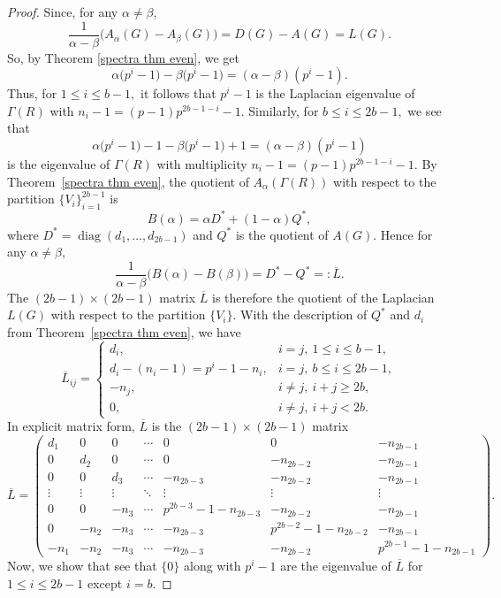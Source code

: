 \documentclass[10pt,a4paper]{amsart}
\begin{document}
\begin{proof}
	Since, for any $\alpha\neq\beta$,
	\[
	\frac{1}{\alpha-\beta}\bigl(A_\alpha(G)-A_\beta(G)\bigr)
	= D(G)-A(G)=L(G).
	\]
	So, by Theorem \ref{spectra thm even}, we get $$\alpha\bigl(p^{ i}-1\bigr)-\beta\bigl(p^{i}-1\bigr)=(\alpha-\beta)(p^{i}-1).$$
	Thus, for $1\le i \le b-1,$ it follows that $p^{i}-1$  is the Laplacian eigenvalue of $ \varGamma(R)$ with $n_i - 1 = (p-1)p^{ 2b-1-i} - 1$. Similarly, for $b\le i \le 2b-1,$ we see that 
	$$\alpha\bigl(p^{ i}-1\bigr) - 1-\beta\bigl(p^{ i}-1\bigr) + 1=(\alpha-\beta)(p^{i}-1) $$ is the eigenvalue of $ \varGamma(R)$ with multiplicity $n_i - 1 = (p-1)p^{ 2b-1-i} - 1$.  By Theorem~\ref{spectra thm even}, the quotient of $A_\alpha( \varGamma(R))$ 
	with respect to the partition $\{V_i\}_{i=1}^{2b-1}$ is
	\[
	B(\alpha) = \alpha D^\ast + (1-\alpha)Q^\ast,
	\]
	where $D^\ast=\operatorname{diag}(d_1,\dots,d_{2b-1})$ and $Q^\ast$ is the quotient of $A(G)$. Hence for any $\alpha\neq\beta$,
	\[
	\frac{1}{\alpha-\beta}\bigl(B(\alpha)-B(\beta)\bigr)
	= D^\ast - Q^\ast =: \overline{L}.
	\]
	The $(2b-1)\times(2b-1)$ matrix $\overline{L}$ is therefore the quotient of the Laplacian $L(G)$ with respect to
	the partition $\{V_i\}$. With the description of $Q^\ast$ and $d_i$ from Theorem~\ref{spectra thm even}, we have
	\[
	\overline{L}_{ij} =
	\begin{cases}
		d_i, & i=j,\ 1\le i\le b-1,\\
		d_i-(n_i-1)=p^{ i}-1-n_i, & i=j,\ b\le i\le 2b-1,\\
		- n_j, & i\ne j,\ i+j\ge 2b,\\
		0, & i\ne j,\ i+j<2b.
	\end{cases}
	\]
In explicit matrix form, $\overline{L}$ is the $(2b-1)\times(2b-1)$ matrix
\[
\overline{L}=
\begin{pmatrix}
	d_1 & 0   & 0   & \cdots & 0         & 0         & -n_{2b-1} \\[3pt]
	0   & d_2 & 0   & \cdots & 0         & -n_{2b-2} & -n_{2b-1} \\[3pt]
	0   & 0   & d_3 & \cdots & -n_{2b-3} & -n_{2b-2} & -n_{2b-1} \\[3pt]
	\vdots & \vdots & \vdots & \ddots & \vdots    & \vdots    & \vdots \\[3pt]
	0   & 0   & -n_3 & \cdots &
	p^{ 2b-3}-1-n_{2b-3} & -n_{2b-2} & -n_{2b-1} \\[3pt]
	0   & -n_2 & -n_3 & \cdots & -n_{2b-3} &
	p^{ 2b-2}-1-n_{2b-2} & -n_{2b-1} \\[3pt]
	-n_1 & -n_2 & -n_3 & \cdots & -n_{2b-3} & -n_{2b-2} &
	p^{ 2b-1}-1-n_{2b-1}
\end{pmatrix}.
\]
Now, we show that see that $\{0\}$ along with $p^{i}-1$ are the eigenvalue of $\overline{L}$ for $1\leq i\leq 2b-1$ except $i=b.$


\end{proof}
\end{document}
